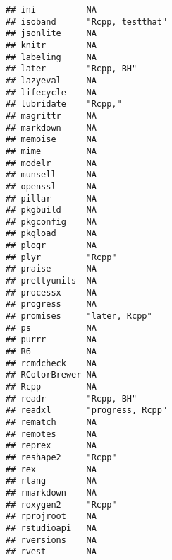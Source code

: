 \documentclass[]{book}
\begin{document}
\begin{verbatim}
## ini          NA                                     
## isoband      "Rcpp, testthat"                       
## jsonlite     NA                                     
## knitr        NA                                     
## labeling     NA                                     
## later        "Rcpp, BH"                             
## lazyeval     NA                                     
## lifecycle    NA                                     
## lubridate    "Rcpp,"                                
## magrittr     NA                                     
## markdown     NA                                     
## memoise      NA                                     
## mime         NA                                     
## modelr       NA                                     
## munsell      NA                                     
## openssl      NA                                     
## pillar       NA                                     
## pkgbuild     NA                                     
## pkgconfig    NA                                     
## pkgload      NA                                     
## plogr        NA                                     
## plyr         "Rcpp"                                 
## praise       NA                                     
## prettyunits  NA                                     
## processx     NA                                     
## progress     NA                                     
## promises     "later, Rcpp"                          
## ps           NA                                     
## purrr        NA                                     
## R6           NA                                     
## rcmdcheck    NA                                     
## RColorBrewer NA                                     
## Rcpp         NA                                     
## readr        "Rcpp, BH"                             
## readxl       "progress, Rcpp"                       
## rematch      NA                                     
## remotes      NA                                     
## reprex       NA                                     
## reshape2     "Rcpp"                                 
## rex          NA                                     
## rlang        NA                                     
## rmarkdown    NA                                     
## roxygen2     "Rcpp"                                 
## rprojroot    NA                                     
## rstudioapi   NA                                     
## rversions    NA                                     
## rvest        NA                                     

\end{verbatim}
\end{document}
